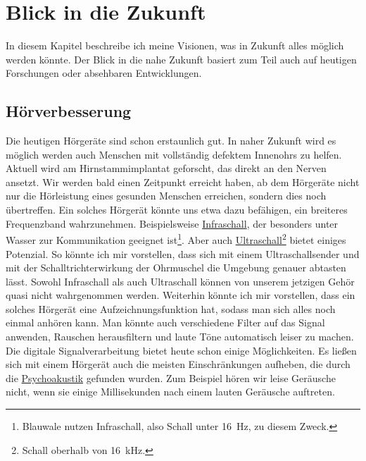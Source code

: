 \section{Blick in die Zukunft}
\label{sec:Robin:future}

In diesem Kapitel beschreibe ich meine Visionen, was in Zukunft alles möglich werden könnte. Der Blick in
die nahe Zukunft basiert zum Teil auch auf heutigen Forschungen oder absehbaren Entwicklungen.

\subsection{Hörverbesserung} %
\label{sec:Robin:future:hearing}
Die heutigen Hörgeräte sind schon erstaunlich gut.
In naher Zukunft wird es möglich werden auch Menschen mit vollständig defektem Innenohrs zu helfen.
Aktuell wird am Hirnstammimplantat geforscht, das direkt an den Nerven ansetzt.
Wir werden bald einen Zeitpunkt erreicht haben, ab dem Hörgeräte nicht nur die Hörleistung eines gesunden
Menschen erreichen, sondern dies noch übertreffen.
Ein solches Hörgerät könnte uns etwa dazu befähigen, ein breiteres Frequenzband
wahrzunehmen. Beispielsweise \href{http://de.wikipedia.org/wiki/Infraschall}{Infraschall}, der
besonders unter Wasser zur Kommunikation geeignet ist\footnote{Blauwale nutzen Infraschall, also
Schall unter \SI{16}{\hertz}, zu diesem Zweck.}. Aber auch
\href{http://de.wikipedia.org/wiki/Ultraschall}{Ultraschall}\footnote{Schall oberhalb von
\SI{16}{\kilo\hertz}.} bietet einiges Potenzial. So könnte ich mir vorstellen, dass sich mit einem
Ultraschallsender und mit der Schalltrichterwirkung der Ohrmuschel die Umgebung genauer abtasten
lässt. Sowohl Infraschall als auch Ultraschall können von unserem jetzigen Gehör quasi nicht
wahrgenommen werden. Weiterhin könnte ich mir vorstellen, dass ein solches Hörgerät eine
Aufzeichnungsfunktion hat, sodass man sich alles noch einmal anhören kann. Man könnte auch
verschiedene Filter auf das Signal anwenden, Rauschen herausfiltern und laute Töne automatisch leiser
zu machen. Die digitale Signalverarbeitung bietet heute schon einige Möglichkeiten.
Es ließen sich mit einem Hörgerät auch die meisten Einschränkungen aufheben, die durch die
\href{http://de.wikipedia.org/wiki/Psychoakustik}{Psychoakustik} gefunden wurden. Zum Beispiel hören
wir leise Geräusche nicht, wenn sie einige Millisekunden nach einem lauten Geräusche auftreten.

